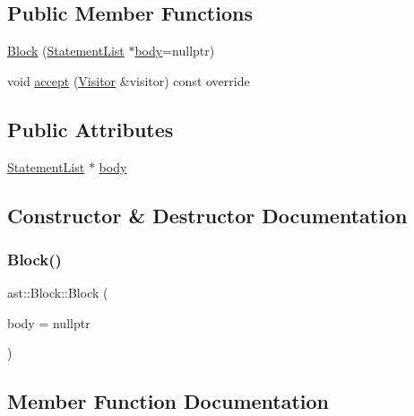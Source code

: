 \subsection*{Public Member Functions}
\begin{DoxyCompactItemize}
\item 
\hyperlink{structast_1_1_block_a006d000dd65024c61c84bf0b956b5f6e}{Block} (\hyperlink{structast_1_1_statement_list}{Statement\+List} $\ast$\hyperlink{structast_1_1_block_a7d7ba772aed3b8db5e26360b4f613410}{body}=nullptr)
\item 
void \hyperlink{structast_1_1_block_a8aec4a97d7f490096ea39ccac79c8676}{accept} (\hyperlink{structast_1_1_visitor}{Visitor} \&visitor) const override
\end{DoxyCompactItemize}
\subsection*{Public Attributes}
\begin{DoxyCompactItemize}
\item 
\hyperlink{structast_1_1_statement_list}{Statement\+List} $\ast$ \hyperlink{structast_1_1_block_a7d7ba772aed3b8db5e26360b4f613410}{body}
\end{DoxyCompactItemize}


\subsection{Constructor \& Destructor Documentation}
\mbox{\label{structast_1_1_block_a006d000dd65024c61c84bf0b956b5f6e}} 
\subsubsection{\texorpdfstring{Block()}{Block()}}
{\footnotesize\ttfamily ast\+::\+Block\+::\+Block (\begin{DoxyParamCaption}\item[{\hyperlink{structast_1_1_statement_list}{Statement\+List} $\ast$}]{body = {\ttfamily nullptr} }\end{DoxyParamCaption})\hspace{0.3cm}{\ttfamily [inline]}}



\subsection{Member Function Documentation}
\mbox{\label{structast_1_1_block_a8aec4a97d7f490096ea39ccac79c8676}} 

